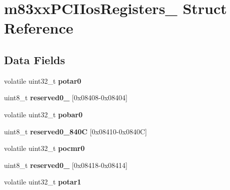 \hypertarget{structm83xxPCIIosRegisters__}{}\section{m83xx\+P\+C\+I\+Ios\+Registers\+\_\+ Struct Reference}
\label{structm83xxPCIIosRegisters__}
\subsection*{Data Fields}
\begin{DoxyCompactItemize}
\item 
\mbox{\label{structm83xxPCIIosRegisters___a0566a8bae0ed29a21d301153ebae8bf5}} 
volatile uint32\+\_\+t {\bfseries potar0}
\item 
\mbox{\label{structm83xxPCIIosRegisters___a7178a7624dd74260d746d42831fb47a3}} 
uint8\+\_\+t {\bfseries reserved0\+\_} \mbox{[}0x08408-\/0x08404\mbox{]}
\item 
\mbox{\label{structm83xxPCIIosRegisters___aee19c8eff3d01440eeb4708e67c6df73}} 
volatile uint32\+\_\+t {\bfseries pobar0}
\item 
\mbox{\label{structm83xxPCIIosRegisters___a8aff9375357b9bce7cf1221ecdffebcb}} 
uint8\+\_\+t {\bfseries reserved0\+\_\+840C} \mbox{[}0x08410-\/0x0840\+C\mbox{]}
\item 
\mbox{\label{structm83xxPCIIosRegisters___a52d717334511153c2f7d8c88bbef1050}} 
volatile uint32\+\_\+t {\bfseries pocmr0}
\item 
\mbox{\label{structm83xxPCIIosRegisters___a33ce4454e45fefe5f028f877877f624c}} 
uint8\+\_\+t {\bfseries reserved0\+\_} \mbox{[}0x08418-\/0x08414\mbox{]}
\item 
\mbox{\label{structm83xxPCIIosRegisters___ade34d59a054a826dbed2be6b1bcd0e8a}} 
volatile uint32\+\_\+t {\bfseries potar1}
\item 
\mbox{\label{structm83xxPCIIosRegisters___a2eb2e26ce0fd1c1bd70ebac55cfd3d6a}} 

\end{DoxyCompactItemize}

